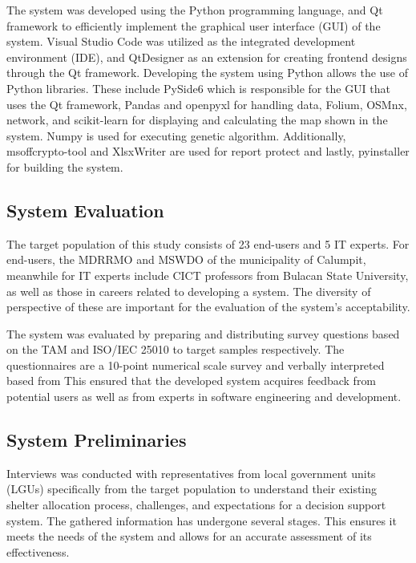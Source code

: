 \documentclass[11pt,letterpaper,]{article}
\begin{document}
	The system was developed using the Python programming language, and Qt framework to efficiently implement the graphical user interface (GUI) of the system. Visual Studio Code was utilized as the integrated development environment (IDE), and QtDesigner as an extension for creating frontend designs through the Qt framework.
	Developing the system using Python allows the use of Python libraries. These include PySide6 which is responsible for the GUI that uses the Qt framework, Pandas and openpyxl for handling data, Folium, OSMnx, network, and scikit-learn for displaying and calculating the map shown in the system. Numpy is used for executing genetic algorithm. Additionally, msoffcrypto-tool and XlsxWriter are used for report protect and lastly, pyinstaller for building the system.
	
	
	\subsection{System Evaluation}
	
	The target population of this study consists of 23 end-users and 5 IT experts. For end-users, the MDRRMO and MSWDO of the municipality of Calumpit, meanwhile for IT experts include CICT professors from Bulacan State University, as well as those in careers related to developing a system. The diversity of perspective of these are important for the evaluation of the system’s acceptability.
	
	The system was evaluated by preparing and distributing survey questions based on the TAM and ISO/IEC 25010 to target samples respectively. The questionnaires are a 10-point numerical scale survey and verbally interpreted based from \textcite{Eladia2024} This ensured that the developed system acquires feedback from potential users as well as from experts in software engineering and development.
	
	\subsection{System Preliminaries}
	
	Interviews was conducted with representatives from local government units (LGUs) specifically from the target population to understand their existing shelter allocation process, challenges, and expectations for a decision support system. The gathered information has undergone several stages. This ensures it meets the needs of the system and allows for an accurate assessment of its effectiveness.
	
\end{document}
